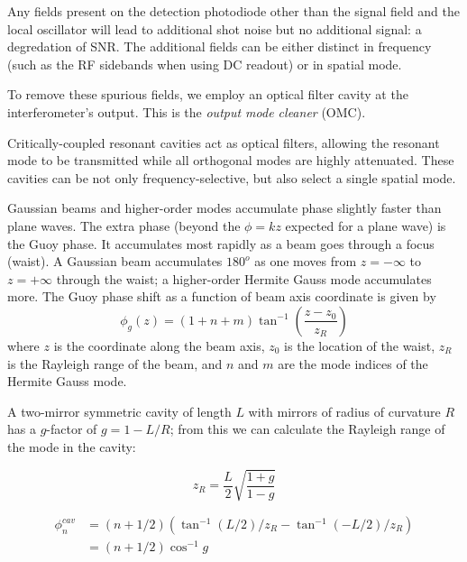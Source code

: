 \label{chapter4}
{}
Any fields present on the detection photodiode other than the signal
field and the local oscillator will lead to additional shot noise but
no additional signal: a degredation of SNR.  The additional fields can
be either distinct in frequency (such as the RF sidebands when using
DC readout) or in spatial mode. 

To remove these spurious fields, we employ an optical filter cavity at
the interferometer's output. This is the \emph{output mode cleaner}
(OMC).  


Critically-coupled resonant cavities act as optical filters, allowing
the resonant mode to be transmitted while all orthogonal modes are
highly attenuated.  These cavities can be not only
frequency-selective, but also select a single spatial mode.

Gaussian beams and higher-order modes accumulate phase slightly faster
than plane waves.  The extra phase (beyond the $\phi=kz$ expected for
a plane wave) is the Guoy phase.  It accumulates most rapidly as a
beam goes through a focus (waist). A Gaussian beam accumulates
$180^o$ as one moves from $z=-\infty$ to $z=+\infty$ through the
waist; a higher-order Hermite Gauss mode accumulates more.  The Guoy
phase shift as a function of beam axis coordinate is given by
%
\begin{equation}
\phi_g(z) = \left(1 + n + m\right) \tan^{-1} \left( \frac{z - z_0}{z_R} \right)
\label{eq:guoy-phase}
\end{equation}
%
where $z$ is the coordinate along the beam axis, $z_0$ is the location
of the waist, $z_R$ is the Rayleigh range of the beam, and $n$ and $m$
are the mode indices of the Hermite Gauss mode.

A two-mirror symmetric cavity of length $L$ with mirrors of radius of
curvature $R$ has a $g$-factor of $g = 1 - L/R$; from this we can
calculate the Rayleigh range of the mode in the cavity:

\begin{equation}
z_R = \frac{L}{2}\sqrt{\frac{1 + g}{1 - g}}
\end{equation}

\begin{align}
\phi^{cav}_n & =  \left(n+1/2\right)\left(\tan^{-1} (L/2)/z_R - \tan^{-1} (-L/2)/z_R\right) \\
            & = \left(n+1/2\right)\cos^{-1} g
\end{align}

